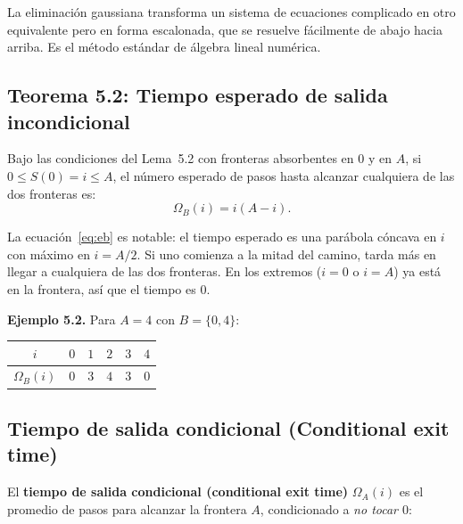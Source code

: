 \documentclass[12pt]{article}
\begin{document}
\begin{intuicion}
La eliminaci\'on gaussiana transforma un sistema de ecuaciones complicado en otro
equivalente pero en forma escalonada, que se resuelve f\'acilmente de abajo hacia
arriba. Es el m\'etodo est\'andar de \'algebra lineal num\'erica.
\end{intuicion}

\subsection{Teorema 5.2: Tiempo esperado de salida incondicional}

\begin{tcolorbox}[colback=gray!5, colframe=gray!50, title=\textbf{Teorema~5.2}]
Bajo las condiciones del Lema~5.2 con fronteras absorbentes en $0$ y en $A$,
si $0 \leq S(0) = i \leq A$, el n\'umero esperado de pasos hasta alcanzar
cualquiera de las dos fronteras es:
\begin{equation}
  \Omega_B(i) = i(A - i).
  \label{eq:eb}
\end{equation}
\end{tcolorbox}

\begin{intuicionmat}
La ecuaci\'on~\eqref{eq:eb} es notable: el tiempo esperado es una par\'abola c\'oncava
en $i$ con m\'aximo en $i = A/2$. Si uno comienza a la mitad del camino,
tarda m\'as en llegar a cualquiera de las dos fronteras. En los extremos
($i = 0$ o $i = A$) ya est\'a en la frontera, as\'i que el tiempo es $0$.
\end{intuicionmat}

\textbf{Ejemplo 5.2.} Para $A = 4$ con $B = \{0, 4\}$:

\begin{center}
\begin{tabular}{c|ccccc}
  \toprule
  $i$ & $0$ & $1$ & $2$ & $3$ & $4$ \\
  \midrule
  $\Omega_B(i)$ & $0$ & $3$ & $4$ & $3$ & $0$ \\
  \bottomrule
\end{tabular}
\end{center}

\subsection{Tiempo de salida condicional (Conditional exit time)}

El \textbf{tiempo de salida condicional (conditional exit time)} $\Omega_A(i)$ es el
promedio de pasos para alcanzar la frontera $A$, condicionado a \emph{no tocar $0$}:
\end{document}
